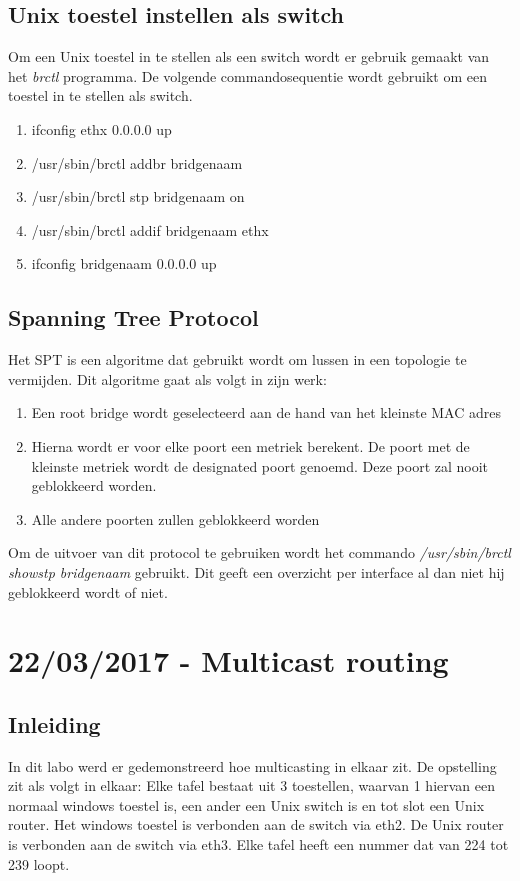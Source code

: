 \documentclass{report}
\begin{document}
\section{Unix toestel instellen als switch}
\label{sec:Unix toestel instellen als switch}
Om een Unix toestel in te stellen als een switch wordt er gebruik gemaakt van het \textit{brctl} programma. De volgende commandosequentie wordt gebruikt om een toestel in te stellen als switch.
\begin{enumerate}
	\item ifconfig ethx 0.0.0.0 up
	\item /usr/sbin/brctl addbr bridgenaam
	\item /usr/sbin/brctl stp bridgenaam on
	\item /usr/sbin/brctl addif bridgenaam ethx
	\item ifconfig bridgenaam 0.0.0.0 up
\end{enumerate}

\section{Spanning Tree Protocol}
Het SPT is een algoritme dat gebruikt wordt om lussen in een topologie te vermijden. Dit algoritme gaat als volgt in zijn werk:
\begin{enumerate}
	\item Een root bridge wordt geselecteerd aan de hand van het kleinste MAC adres
	\item Hierna wordt er voor elke poort een metriek berekent. De poort met de kleinste metriek wordt de designated poort genoemd. Deze poort zal nooit geblokkeerd worden.
	\item Alle andere poorten zullen geblokkeerd worden
\end{enumerate}
Om de uitvoer van dit protocol te gebruiken wordt het commando \textit{/usr/sbin/brctl showstp bridgenaam} gebruikt. Dit geeft een overzicht per interface al dan niet hij geblokkeerd wordt of niet.
\chapter{22/03/2017 - Multicast routing}
\section{Inleiding}
In dit labo werd er gedemonstreerd hoe multicasting in elkaar zit. De opstelling zit als volgt in elkaar: Elke tafel bestaat uit 3 toestellen, waarvan 1 hiervan een normaal windows toestel is, een ander een Unix switch is en tot slot een Unix router. Het windows toestel is verbonden aan de switch via eth2. De Unix router is verbonden aan de switch via eth3. Elke tafel heeft een nummer dat van 224 tot 239 loopt.
\end{document}
